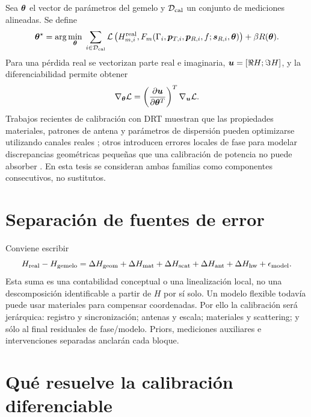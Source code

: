 Sea $\bm{\theta}$ el vector de parámetros del gemelo y $\mathcal D_{\rm cal}$ un conjunto de mediciones alineadas. Se define
\begin{equation}
\bm{\theta}^\star=\arg\min_{\bm{\theta}}\;
\sum_{i\in\mathcal D_{\rm cal}}
\mathcal{L}\left(
H_{m,i}^{\rm real},
F_m(\Gamma_i,\bm{p}_{T,i},\bm{p}_{R,i},f;
\bm{s}_{R,i},\bm{\theta})
\right)+\beta R(\bm{\theta}).
\label{eq:calibration_inverse}
\end{equation}
Para una pérdida real se vectorizan parte real e imaginaria, $\bm{u}=[\Re H;\Im H]$, y la diferenciabilidad permite obtener
\begin{equation}
\nabla_{\bm{\theta}}\mathcal{L}
=\left(\frac{\partial\bm{u}}{\partial\bm{\theta}^T}\right)^T
\nabla_{\bm{u}}\mathcal{L}.
\end{equation}
Trabajos recientes de calibración con \ac{DRT} muestran que las propiedades materiales, patrones de antena y parámetros de dispersión pueden optimizarse utilizando canales reales \citep{Hoydis2024DiffRT}; otros introducen errores locales de fase para modelar discrepancias geométricas pequeñas que una calibración de potencia no puede absorber \citep{Ruah2024Phase}. En esta tesis se consideran ambas familias como componentes consecutivos, no sustitutos.

\section{Separación de fuentes de error}

Conviene escribir
\begin{equation}
H_{\rm real}-H_{\rm gemelo}=
\Delta H_{\rm geom}+
\Delta H_{\rm mat}+
\Delta H_{\rm scat}+
\Delta H_{\rm ant}+
\Delta H_{\rm hw}+
\epsilon_{\rm model}.
\label{eq:domain_gap_decomp}
\end{equation}
Esta suma es una contabilidad conceptual o una linealización local, no una descomposición identificable a partir de $H$ por sí solo. Un modelo flexible todavía puede usar materiales para compensar coordenadas. Por ello la calibración será jerárquica: registro y sincronización; antenas y escala; materiales y scattering; y sólo al final residuales de fase/modelo. Priors, mediciones auxiliares e intervenciones separadas anclarán cada bloque.

\section{Qué resuelve la calibración diferenciable}
\label{sec:literature_evidence_hierarchy}

